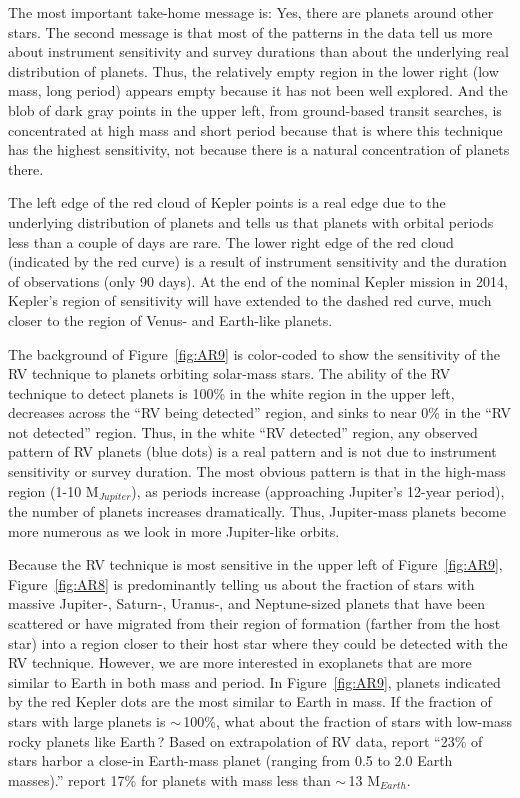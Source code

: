 The most important take-home message is: Yes, there are planets around other stars. The second message is that most of the patterns in the data tell us more about instrument sensitivity and survey durations than about the underlying real distribution of planets. Thus, the relatively empty region in the lower right (low mass, long period) appears empty because it has not been well explored. And the blob of dark gray points in the upper left, from ground-based transit searches, is concentrated at high mass and short period because that is where this technique has the highest sensitivity, not because there is a natural concentration of planets there.

The left edge of the red cloud of Kepler points is a real edge due to the underlying distribution of planets and tells us that planets with orbital periods less than a couple of days are rare. The lower right edge of the red cloud (indicated by the red curve) is a result of instrument sensitivity and the duration of observations (only 90 days). At the end of the nominal Kepler mission in 2014, Kepler's region of sensitivity will have extended to the dashed red curve, much closer to the region of Venus- and Earth-like planets.

The background of Figure~\ref{fig:AR9} is color-coded to show the sensitivity of the RV technique to planets orbiting solar-mass stars. The ability of the RV technique to detect planets is 100\% in the white region in the upper left, decreases across the ``RV being detected'' region, and sinks to near 0\% in the ``RV not detected'' region. Thus, in the white ``RV detected'' region, any observed pattern of RV planets (blue dots) is a real pattern and is not due to instrument sensitivity or survey duration. The most obvious pattern is that in the high-mass region (1-10 M$_{Jupiter}$), as periods increase (approaching Jupiter's 12-year period), the number of planets increases dramatically. Thus, Jupiter-mass planets become more numerous as we look in more Jupiter-like orbits.

Because the RV technique is most sensitive in the upper left of Figure~\ref{fig:AR9}, Figure~\ref{fig:AR8} is predominantly telling us about the fraction of stars with massive Jupiter-, Saturn-, Uranus-, and Neptune-sized planets that have been scattered or have migrated from their region of formation (farther from the host star) into a region closer to their host star where they could be detected with the RV technique. However, we are more interested in exoplanets that are more similar to Earth in both mass and period. In Figure~\ref{fig:AR9}, planets indicated by the red Kepler dots are the most similar to Earth in mass. If the fraction of stars with large planets is $\sim$\,100\%, what about the fraction of stars with low-mass rocky planets like Earth\,? Based on extrapolation of RV data, \citet{Howard2010} report ``23\% of stars harbor a close-in Earth-mass planet (ranging from 0.5 to 2.0 Earth masses).'' \citet{Wittenmyer2011} report 17\% for planets with mass less than $\sim$\,13 M$_{Earth}$.


